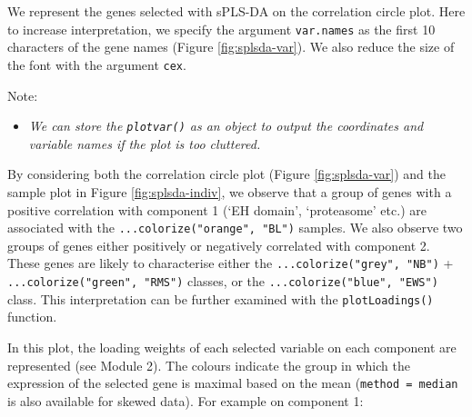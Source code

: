 \documentclass[
]{book}
\newenvironment{Shaded}{\begin{snugshade}}{\end{snugshade}}
\newcommand{\AttributeTok}[1]{\textcolor[rgb]{0.77,0.63,0.00}{#1}}
\newcommand{\DecValTok}[1]{\textcolor[rgb]{0.00,0.00,0.81}{#1}}
\newcommand{\FunctionTok}[1]{\textcolor[rgb]{0.00,0.00,0.00}{#1}}
\newcommand{\NormalTok}[1]{#1}
\newcommand{\OtherTok}[1]{\textcolor[rgb]{0.56,0.35,0.01}{#1}}
\newcommand{\SpecialCharTok}[1]{\textcolor[rgb]{0.00,0.00,0.00}{#1}}
\providecommand{\tightlist}{%
  \setlength{\itemsep}{0pt}\setlength{\parskip}{0pt}}
\begin{document}
We represent the genes selected with sPLS-DA on the correlation circle plot. Here to increase interpretation, we specify the argument \texttt{var.names} as the first 10 characters of the gene names (Figure \ref{fig:splsda-var}). We also reduce the size of the font with the argument \texttt{cex}.

Note:

\begin{itemize}
\tightlist
\item
  \emph{We can store the \texttt{plotvar()} as an object to output the coordinates and variable names if the plot is too cluttered.}
\end{itemize}

\begin{Shaded}
\end{Shaded}



By considering both the correlation circle plot (Figure \ref{fig:splsda-var}) and the sample plot in Figure \ref{fig:splsda-indiv}, we observe that a group of genes with a positive correlation with component 1 (`EH domain', `proteasome' etc.) are associated with the \texttt{...colorize("orange",\ "BL")} samples. We also observe two groups of genes either positively or negatively correlated with component 2. These genes are likely to characterise either the \texttt{...colorize("grey",\ "NB")} + \texttt{...colorize("green",\ "RMS")} classes, or the \texttt{...colorize("blue",\ "EWS")} class. This interpretation can be further examined with the \texttt{plotLoadings()} function.

In this plot, the loading weights of each selected variable on each component are represented (see Module 2). The colours indicate the group in which the expression of the selected gene is maximal based on the mean (\texttt{method\ =\ \textquotesingle{}median\textquotesingle{}} is also available for skewed data). For example on component 1:
\end{document}
